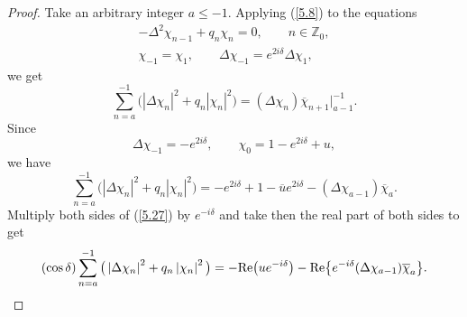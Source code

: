 \documentclass[pdftex]{sigma}
\numberwithin{equation}{section}
\begin{document}
\begin{proof}
Take an arbitrary integer $a\leq -1.$ Applying (\ref{5.8}) to the equations%
\begin{gather*}
-\Delta ^{2}\chi _{n-1}+q_{n}\chi _{n}=0,\qquad n\in
\mathbb{Z}
_{0},
\\
\chi _{-1}=\chi _{1},\qquad \Delta \chi _{-1}=e^{2i\delta }\Delta \chi
_{1},
\end{gather*}
we get%
\[
\sum_{n=a}^{-1}\big( \left\vert \Delta \chi _{n}\right\vert
^{2}+q_{n}\left\vert \chi _{n}\right\vert ^{2}\big) =(\Delta \chi _{n})%
\overline{\chi }_{n+1}\big|_{a-1}^{-1}.
\]%
Since%
\[
\Delta \chi _{-1}=-e^{2i\delta },\qquad \chi _{0}=1-e^{2i\delta }+u,
\]%
we have%
\begin{equation}
\sum_{n=a}^{-1}\big( \left\vert \Delta \chi _{n}\right\vert
^{2}+q_{n}\left\vert \chi _{n}\right\vert ^{2}\big) =-e^{2i\delta }+1-%
\overline{u}e^{2i\delta }-(\Delta \chi _{a-1})\overline{\chi }_{a}.
\label{5.27}
\end{equation}%
Multiply both sides of (\ref{5.27}) by $e^{-i\delta }$ and take then the
real part of both sides to get%
\begin{equation}
(\cos \delta )\sum_{n=a}^{-1}\big( \left\vert \Delta \chi _{n}\right\vert
^{2}+q_{n}\left\vert \chi _{n}\right\vert ^{2}\big) =-{\rm Re}
\big(ue^{-i\delta }\big)-{\rm Re}\big\{ e^{-i\delta }(\Delta \chi _{a-1})%
\overline{\chi }_{a}\big\} .  \label{5.28}
\end{equation}


\end{proof}
\end{document}
